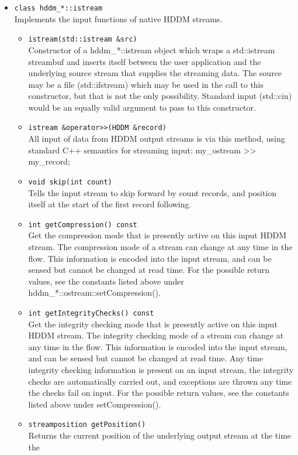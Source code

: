 \documentclass{revtex4}
\begin{document}
\begin{itemize}
\item \texttt{class hddm\_*::istream}\\
Implements the input functions of native HDDM streams.
\begin{itemize}
\item \texttt{istream(std::istream \&src)}\\
Constructor of a hddm\_*::istream object which wraps a std::istream streambuf
and inserts itself between the user application and the underlying source stream
that supplies the streaming data. The source may be a file (std::ifstream) which
may be used in the call to this constructor, but that is not the only
possibility. Standard input (std::cin) would be an equally valid argument to
pass to this constructor.
\item \texttt{istream \&operator>>(HDDM \&record)}\\
All input of data from HDDM output streams is via this method, using standard
C++ semantics for streaming input: my\_ostream >> my\_record;
\item \texttt{void skip(int count)}\\
Tells the input stream to skip forward by count records, and position itself
at the start of the first record following.
\item \texttt{int getCompression() const}\\
Get the compression mode that is presently active on this input HDDM stream.
The compression mode of a stream can change at any time in the flow. This
information is encoded into the input stream, and can be sensed but cannot be
changed at read time. For the possible return values, see the constants listed
above under hddm\_*::ostream::setCompression().
\item \texttt{int getIntegrityChecks() const}\\
Get the integrity checking mode that is presently active on this input HDDM 
stream. The integrity checking mode of a stream can change at any time in the
flow. This information is encoded into the input stream, and can be sensed but
cannot be changed at read time. Any time integrity checking information is 
present on an input stream, the integrity checks are automatically carried out,
and exceptions are thrown any time the checks fail on input. For the possible
return values, see the constants listed above under setCompression().
\item \texttt{streamposition getPosition()}\\
Returns the current position of the underlying output stream at the time the

\end{itemize}
\end{itemize}
\end{document}

